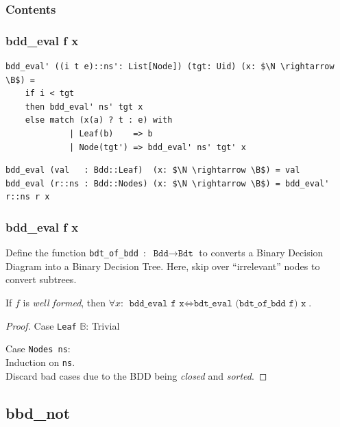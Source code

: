 \documentclass[english, aspectratio=169]{beamer}
\newcommand{\B}[0]{\ensuremath{\mathbb{B}}}
\begin{document}
\begin{frame}{}
  \frametitle{Contents}
\end{frame}

\begin{frame}[fragile]
  \frametitle{bdd\_eval f x}

  \begin{lstlisting}
bdd_eval' ((i t e)::ns': List[Node]) (tgt: Uid) (x: $\N \rightarrow \B$) =
    if i < tgt
    then bdd_eval' ns' tgt x
    else match (x(a) ? t : e) with
             | Leaf(b)    => b
             | Node(tgt') => bdd_eval' ns' tgt' x
   \end{lstlisting}
   \begin{lstlisting}[firstnumber=7]
bdd_eval (val   : Bdd::Leaf)  (x: $\N \rightarrow \B$) = val
bdd_eval (r::ns : Bdd::Nodes) (x: $\N \rightarrow \B$) = bdd_eval' r::ns r x
  \end{lstlisting}
\end{frame}

\begin{frame}
  \frametitle{bdd\_eval f x}

  Define the function \texttt{bdt\_of\_bdd}~:~$\texttt{Bdd} \rightarrow \texttt{Bdt}$ to converts a
  Binary Decision Diagram into a Binary Decision Tree. Here, skip over ``irrelevant'' nodes to
  convert subtrees.

  \pause

  \begin{theorem}
    If $f$ is \emph{well formed}, then $\forall x$:
    $\texttt{bdd\_eval f x} \iff \texttt{bdt\_eval (bdt\_of\_bdd f) x}$.
  \end{theorem}
  \begin{proof}
    Case \texttt{Leaf} $\B$: Trivial

    Case \texttt{Nodes ns}:\\
    \quad Induction on \texttt{ns}.\\
    \quad Discard bad cases due to the BDD being \emph{closed} and \emph{sorted}.
  \end{proof}
\end{frame}

\subsection{bbd\_not}
\end{document}
